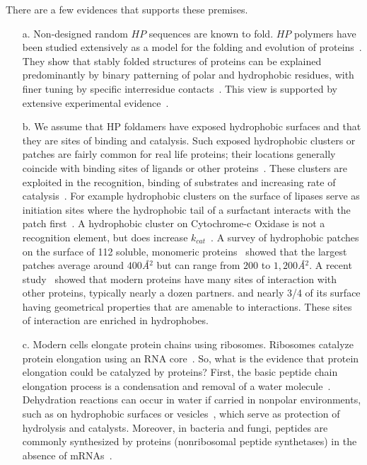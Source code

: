 \documentclass[journal=jacsat,manuscript=article,layout=twocolumn]{achemso}
\begin{document}
There are a few evidences that supports these premises.
\begin{itemize}
\item [a.] Non-designed random $HP$ sequences 
are known to fold.  $HP$ polymers have been studied extensively as a model for the folding and 
evolution of proteins~\cite{lau1989lattice,Chan1991,Miller1995,Yue1995,agarwala1997local}.  They 
show that stably folded structures of proteins can be explained predominantly by binary patterning 
of polar and hydrophobic residues, with finer tuning by specific interresidue 
contacts~\cite{Yue1992,Xiong1995}.  This view is supported by extensive experimental 
evidence~\cite{Lim1991,Kamtekar1993,Wei2003,Brisendine2015}. 

\item [b.]
We assume that HP foldamers have exposed hydrophobic surfaces and that they are sites of binding 
and catalysis. Such exposed hydrophobic clusters or patches are fairly common for 
real life proteins; their locations generally coincide with binding sites of ligands or other 
proteins~\cite{Lijnzaad1996}. These clusters are exploited in the recognition, binding of 
substrates and 
increasing rate of catalysis~\cite{MitchellGuss1983,Lijnzaad1996,VanEe1997,Witt1998}. For example 
hydrophobic clusters on the surface of lipases serve as initiation sites where the hydrophobic 
tail of a surfactant interacts with the patch first~\cite{VanEe1997}. A hydrophobic 
cluster on Cytochrome-c 
Oxidase is not a recognition element, but does increase $k_{cat}$~\cite{Witt1998}. A survey of 
hydrophobic patches on the surface of 112 soluble, monomeric proteins~\cite{Lijnzaad1996} showed 
that the largest patches average around $400$\textit{\AA}$^2$ but can range from $200$ to 
$1,200$\textit{\AA}$^2$. A recent study~\cite{Tonddast-Navaei2015} showed that modern proteins have 
many sites of interaction with other proteins, typically nearly a dozen partners.  and nearly 3/4 
of 
its surface having geometrical properties that are amenable to interactions. These sites of 
interaction are enriched in hydrophobes.

\item [c.] Modern cells elongate protein chains using 
ribosomes.  Ribosomes catalyze protein elongation using an RNA core~\cite{Nissen2000}.  So, what is 
the evidence that protein elongation could be catalyzed by proteins?  First, the basic peptide 
chain elongation process is a condensation and removal of a water 
molecule~\cite[chapter 3, p.~82]{Nelson2008}.  Dehydration reactions can occur in water if carried 
in nonpolar environments, such as on hydrophobic surfaces or 
vesicles~\cite{Manabe2001,Manabe2002}, which serve as protection of hydrolysis and catalysts.  
Moreover, in bacteria and fungi, peptides are commonly synthesized by proteins (nonribosomal 
peptide synthetases) in the absence of mRNAs~\cite{Stachelhaus1998,marahiel2009working}.
\end{itemize}
\end{document}
